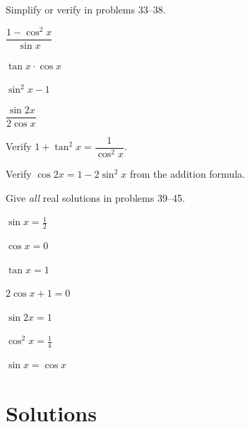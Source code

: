 Simplify or verify in problems 33--38.

\begin{problems}[resume]
  \item $\dfrac{1-\cos^{2}x}{\sin x}$
  \item $\tan x\cdot\cos x$
  \item $\sin^{2}x-1$
  \item $\dfrac{\sin 2x}{2\cos x}$
  \item Verify $1+\tan^{2}x=\dfrac{1}{\cos^{2}x}$.
  \item Verify $\cos 2x=1-2\sin^{2}x$ from the addition formula.
\end{problems}

Give \emph{all} real solutions in problems 39--45.

\begin{problems}[resume]
  \item $\sin x=\tfrac12$
  \item $\cos x=0$
  \item $\tan x=1$
  \item $2\cos x+1=0$
  \item $\sin 2x=1$
  \item $\cos^{2}x=\tfrac14$
  \item $\sin x=\cos x$
\end{problems}

\section{Solutions}

